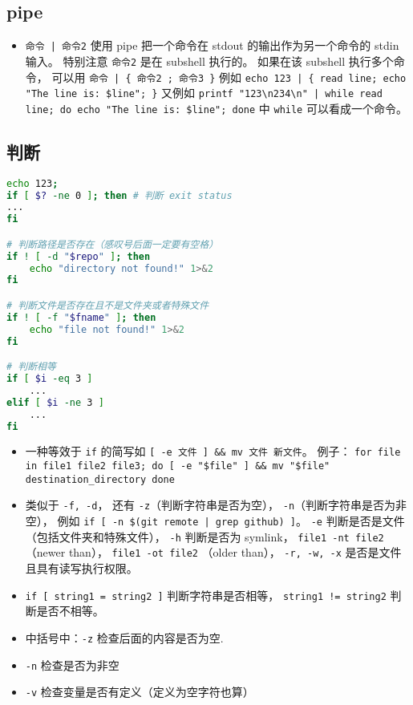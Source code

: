 \subsection{pipe}
\begin{itemize}
\item \verb`命令 | 命令2` 使用 pipe 把一个命令在 stdout 的输出作为另一个命令的 stdin 输入。 特别注意 \verb`命令2` 是在 subshell 执行的。 如果在该 subshell 执行多个命令， 可以用 \verb`命令 | { 命令2 ; 命令3 }` 例如 \verb`echo 123 | { read line; echo "The line is: $line"; }` 又例如 \verb`printf "123\n234\n" | while read line; do echo "The line is: $line"; done` 中 \verb`while` 可以看成一个命令。
\end{itemize}


\subsection{判断}
\begin{lstlisting}[language=bash]
echo 123;
if [ $? -ne 0 ]; then # 判断 exit status
...
fi

# 判断路径是否存在（感叹号后面一定要有空格）
if ! [ -d "$repo" ]; then
    echo "directory not found!" 1>&2
fi

# 判断文件是否存在且不是文件夹或者特殊文件
if ! [ -f "$fname" ]; then
    echo "file not found!" 1>&2
fi

# 判断相等
if [ $i -eq 3 ]
    ...
elif [ $i -ne 3 ]
    ...
fi
\end{lstlisting}
\begin{itemize}
\item 一种等效于 \verb`if` 的简写如 \verb`[ -e 文件 ] && mv 文件 新文件`。 例子： \verb`for file in file1 file2 file3; do [ -e "$file" ] && mv "$file" destination_directory done`
\item 类似于 \verb`-f, -d`， 还有 \verb`-z`（判断字符串是否为空）， \verb`-n`（判断字符串是否为非空）， 例如 \verb`if [ -n $(git remote | grep github) ]`。  \verb`-e` 判断是否是文件（包括文件夹和特殊文件）， \verb`-h` 判断是否为 symlink， \verb`file1 -nt file2` （newer than）， \verb`file1 -ot file2` （older than）， \verb`-r, -w, -x` 是否是文件且具有读写执行权限。
\item \verb`if [ string1 = string2 ]` 判断字符串是否相等， \verb`string1 != string2` 判断是否不相等。
\item 中括号中：\verb`-z` 检查后面的内容是否为空.
\item \verb`-n` 检查是否为非空
\item \verb`-v` 检查变量是否有定义（定义为空字符也算）
\end{itemize}


